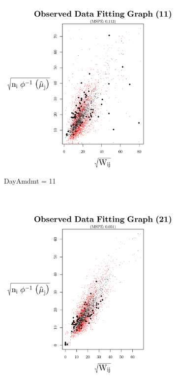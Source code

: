 \documentclass{template}
\begin{document}
\begin{figure}[ht!]
    \centering
    \begin{subfigure}[b]{0.40\textheight}
        \includegraphics[width=\textwidth]{Images/XiaPlotWBars11.pdf}
        \caption{DayAmdmt = 11}
    \end{subfigure}
\\
    \begin{subfigure}[b]{0.40\textheight}
        \includegraphics[width=\textwidth]{Images/XiaPlotWBars21.pdf}

\end{subfigure}
\end{figure}
\end{document}
